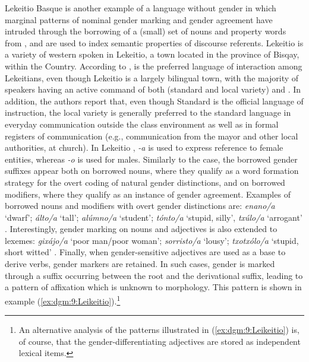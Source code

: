 \documentclass[output=collectionpaper]{langsci/langscibook}
\begin{document}
Lekeitio Basque is another example of a 
language without gender in which marginal patterns of nominal gender marking and gender agreement have intruded through the borrowing of a (small) set of nouns and property words from , and are used to index semantic properties of discourse referents. Lekeitio  is a variety of western  spoken in Lekeitio, a town located in the province of Bisqay, within the   Country. According to \citet[1--2]{Hualde1994},  is the preferred language of interaction among Lekeitians, even though Lekeitio is a largely bilingual town, with the majority of speakers having an active command of both  (standard and local variety) and . In addition, the authors report that, even though Standard  is the official language of instruction, the local variety is generally preferred to the standard language in everyday communication outside the class environment as well as in formal registers of communication (e.g., communication from the mayor and other local authorities, at church). In Lekeitio , \textit{-a} is used to express reference to female entities, whereas \textit{-o} is used for males. Similarly to the  case, the borrowed gender suffixes appear both on borrowed nouns, where they qualify as a word formation strategy for the overt coding of natural gender distinctions, and on borrowed modifiers, where they qualify as an instance of gender agreement. Examples of borrowed nouns and modifiers with overt gender distinctions are: \textit{enano/a} `dwarf'; \textit{\'alto/a} `tall'; \textit{al\'umno/a} `student'; \textit{t\'onto/a} `stupid, silly', \textit{tx\'ulo/a} `arrogant' \citep[108--109]{Hualde1994}. Interestingly, gender marking on nouns and adjectives is also extended to  lexemes: \textit{gix\'ajo/a} `poor man/poor woman'; \textit{sorristo/a} `lousy'; \textit{txotx\'olo/a} `stupid, short witted' \citep[109]{Hualde1994}. Finally, when gender-sensitive adjectives are used as a base to derive verbs, gender markers are retained. In such cases, gender is marked through a suffix occurring between the root and the derivational suffix, leading to a pattern of affixation which is unknown to  morphology. This pattern is shown in example (\ref{ex:dgm:9:Leikeitio}).\footnote{An alternative analysis of the patterns illustrated in (\ref{ex:dgm:9:Leikeitio}) is, of course, that the gender-differentiating adjectives are stored as independent lexical items.}
\end{document}
